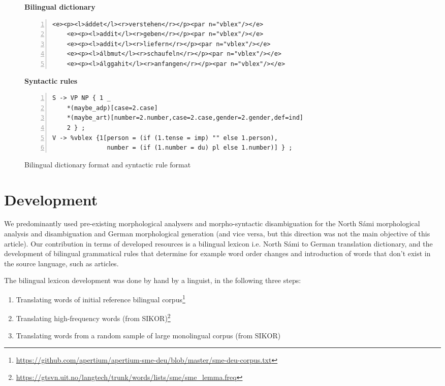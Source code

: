 \documentclass{flammie}
\begin{document}
\begin{figure*}
\small
    \textbf{Bilingual dictionary}
   \begin{lstlisting}[numbers=left]
    <e><p><l>áddet</l><r>verstehen</r></p><par n="vblex"/></e>
    <e><p><l>addit</l><r>geben</r></p><par n="vblex"/></e>
    <e><p><l>addit</l><r>liefern</r></p><par n="vblex"/></e>
    <e><p><l>álbmut</l><r>schaufeln</r></p><par n="vblex"/></e>
    <e><p><l>álggahit</l><r>anfangen</r></p><par n="vblex"/></e>
   \end{lstlisting}
   \textbf{Syntactic rules}
   \begin{lstlisting}[numbers=left]
S -> VP NP { 1 _
    *(maybe_adp)[case=2.case]
    *(maybe_art)[number=2.number,case=2.case,gender=2.gender,def=ind]
    2 } ;
V -> %vblex {1[person = (if (1.tense = imp) "" else 1.person),
               number = (if (1.number = du) pl else 1.number)] } ;
   \end{lstlisting}
 \caption{Bilingual dictionary format and syntactic rule format
 \label{fig:code}}
\end{figure*}



\section{Development}

We predominantly used pre-existing morphological analysers and morpho-syntactic
disambiguation for the North Sámi morphological analysis and disambiguation and
German morphological generation (and vice versa, but this direction was not the
main objective of this article). Our contribution in terms of developed
resources is a bilingual lexicon i.e. North Sámi to German translation
dictionary, and the development of bilingual grammatical rules that determine
for example word order changes and introduction of words that don't exist in the
source language, such as articles.


The bilingual lexicon development was done by hand by a linguist, in the
following three steps:

\begin{enumerate}
    \item Translating words of initial reference bilingual
        corpus\footnote{\url{https://github.com/apertium/apertium-sme-deu/blob/master/sme-deu-corpus.txt}}
    \item Translating high-frequency words (from
        SIKOR)\footnote{\url{https://gtsvn.uit.no/langtech/trunk/words/lists/sme/sme_lemma.freq}}
    \item Translating words from a random sample of large monolingual corpus
        (from SIKOR)
\end{enumerate}
\end{document}
